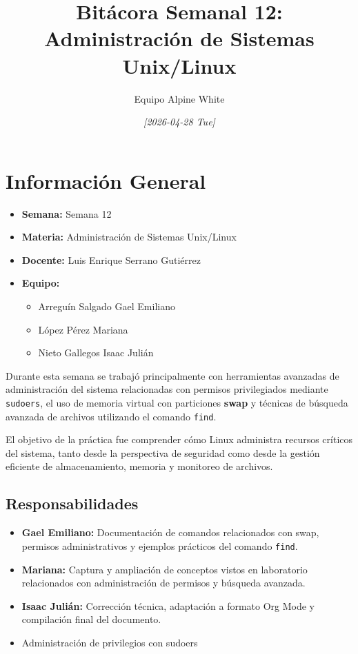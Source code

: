 \documentclass[11pt, letterpaper]{article}
\author{Equipo Alpine White}
\date{\textit{{[}2026-04-28 Tue]}}
\title{Bitácora Semanal 12: Administración de Sistemas Unix/Linux}
\begin{document}
\maketitle
\setcounter{tocdepth}{2}
\tableofcontents

\section{Información General}
\label{sec:orgcb0ce24}

\begin{itemize}
\item \textbf{Semana:} Semana 12
\item \textbf{Materia:} Administración de Sistemas Unix/Linux
\item \textbf{Docente:} Luis Enrique Serrano Gutiérrez
\item \textbf{Equipo:}

\begin{itemize}
\item Arreguín Salgado Gael Emiliano
\item López Pérez Mariana
\item Nieto Gallegos Isaac Julián
\end{itemize}
\end{itemize}

Durante esta semana se trabajó principalmente con herramientas avanzadas de administración del sistema relacionadas con permisos privilegiados mediante \texttt{sudoers}, el uso de memoria virtual con particiones \textbf{swap} y técnicas de búsqueda avanzada de archivos utilizando el comando \texttt{find}.

El objetivo de la práctica fue comprender cómo Linux administra recursos críticos del sistema, tanto desde la perspectiva de seguridad como desde la gestión eficiente de almacenamiento, memoria y monitoreo de archivos.
\subsection{Responsabilidades}
\label{sec:org0c4c583}

\begin{itemize}
\item \textbf{Gael Emiliano:} Documentación de comandos relacionados con swap, permisos administrativos y ejemplos prácticos del comando \texttt{find}.
\item \textbf{Mariana:} Captura y ampliación de conceptos vistos en laboratorio relacionados con administración de permisos y búsqueda avanzada.
\item \textbf{Isaac Julián:} Corrección técnica, adaptación a formato Org Mode y compilación final del documento.

\item Administración de privilegios con sudoers
\end{itemize}
\end{document}
